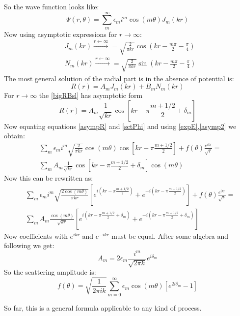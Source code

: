 So the wave function looks like:
\begin{equation}
 \Psi(r,\theta) = \sum_m^{\infty}{\epsilon_m i^m \cos(m\theta)J_m(kr)}
\end{equation}
Now using asymptotic expressions for $ r \rightarrow \infty $:
\begin{equation}\label{}
\begin{split}
& J_m(kr) \xrightarrow{r \leftarrow \infty}  = \sqrt{\frac{2}{\pi k r}}\cos\left(kr - \frac{m\pi}{2} - \frac{\pi}{4}\right) \\[.7em]
& N_m(kr) \xrightarrow{r \leftarrow \infty}  = \sqrt{\frac{2}{\pi k r}}\sin\left(kr - \frac{m\pi}{2} - \frac{\pi}{4}\right)
\end{split}
\end{equation}
The most general solution of the radial part is in the absence of potential is:
\begin{equation}\label{bigRBsl}
R(r) = A_mJ_m(kr) + B_mN_m(kr) 
\end{equation}
For $ r \rightarrow\infty $ the \eqref{bigRBsl} has asymptotic form
\begin{equation}\label{asympR}
R(r) = A_m\frac{1}{\sqrt{kr}}\cos\left[kr-\pi\frac{m + 1/2}{2} + \delta_m\right]
\end{equation}
Now equating equations \eqref{asympR} and \eqref{sctPhi} and using \eqref{expE},\eqref{asymp2} we obtain:
\begin{equation}\label{asymR2}
\begin{split}
& \sum_m{\epsilon_m i^m\sqrt{\frac{2}{\pi kr}}\cos(m\theta)\cos\left[kr-\pi\frac{m + 1/2}{2}\right]} + f(\theta)\frac{e^{ikr}}{\sqrt{r}} = \\[.7em]
& \sum_m{A_m\frac{1}{\sqrt{kr}}\cos\left[kr-\pi\frac{m + 1/2}{2} + \delta_m\right]\cos(m\theta)}
\end{split}
\end{equation}
Now this can be rewritten as:
\begin{equation}\label{asyR3}
\begin{split}
& \sum_m{\epsilon_m i^m \sqrt{\frac{2\cos(m\theta)}{\pi kr}}\left[e^{i\left(kr-\pi\frac{m + 1/2}{2}\right)} + e^{-i\left(kr-\pi\frac{m + 1/2}{2}\right)}\right]}
+ f(\theta)\frac{e^{ikr}}{\sqrt{r}} = \\[.7em]
& \sum_m{A_m\frac{\cos(m\theta)}{\sqrt{kr}}\left[e^{i\left(kr-\pi\frac{m + 1/2}{2} + \delta_m\right)} + e^{-i\left(kr-\pi\frac{m + 1/2}{2} + \delta_m\right)}\right]}
\end{split}
\end{equation}
Now coefficients with $ e^{ikr} $ and $ e^{-ikr} $ must be equal. After some algebra and following \cite{2DScatter2} we get:
\begin{equation}\label{AandDelta}
A_m = 2\epsilon_m \frac{i^m}{\sqrt{2\pi k}}e^{i\delta_m}
\end{equation}
So the scattering amplitude is:
\begin{equation}
f(\theta) = \sqrt{\frac{1}{2\pi i k}}\sum_{m=0}^{\infty}{\epsilon_m\cos(m\theta)\left[e^{2i\delta_m}-1\right]}
\end{equation}

So far, this is a general formula applicable to any kind of process.

